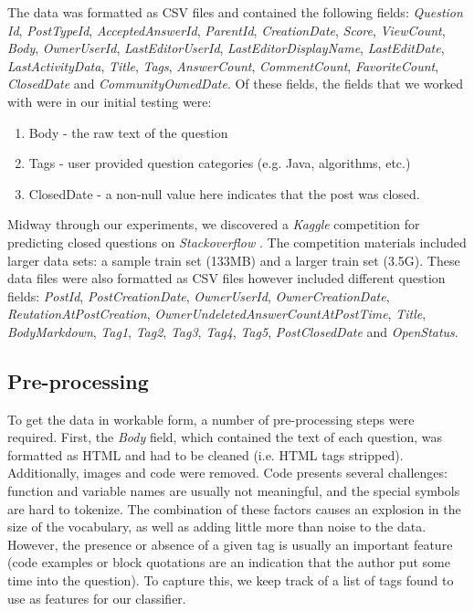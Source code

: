 \documentclass[11pt]{article}
\begin{document}
The data was formatted as CSV files and contained the following
fields: \emph{Question Id}, \emph{PostTypeId}, \emph{AcceptedAnswerId}, \emph{ParentId},
\emph{CreationDate}, \emph{Score}, \emph{ViewCount}, \emph{Body}, \emph{OwnerUserId}, \emph{LastEditorUserId}, \emph{LastEditorDisplayName}, \emph{LastEditDate}, \emph{LastActivityData}, \emph{Title}, \emph{Tags},
\emph{AnswerCount}, \emph{CommentCount}, \emph{FavoriteCount}, \emph{ClosedDate} and
\emph{CommunityOwnedDate}. Of these fields, the fields that we worked with
were in our initial testing were:

\begin{enumerate}
  \item Body - the raw text of the question
  \item Tags - user provided question categories (e.g. Java,
    algorithms, etc.)
  \item ClosedDate - a non-null value here indicates that the post was closed.
\end{enumerate}

Midway through our experiments, we discovered a \emph{Kaggle}
competition for predicting closed questions on \emph{Stackoverflow}
\cite{website:kaggle}. The competition materials included larger data sets: a
sample train set (133MB) and a larger train set (3.5G).  These data
files were also formatted as CSV files however included different
question fields: \emph{PostId}, \emph{PostCreationDate}, \emph{OwnerUserId},
\emph{OwnerCreationDate}, \emph{ReutationAtPostCreation},
\emph{OwnerUndeletedAnswerCountAtPostTime}, \emph{Title}, \emph{BodyMarkdown}, \emph{Tag1}, \emph{Tag2},
\emph{Tag3}, \emph{Tag4}, \emph{Tag5}, \emph{PostClosedDate} and \emph{OpenStatus}.

\subsection{Pre-processing}
To get the data in workable form, a number of pre-processing steps
were required. First, the \emph{Body} field, which contained the text of
each question, was formatted as HTML and had to be
cleaned (i.e. HTML tags stripped). Additionally, images and code were
removed. Code presents several challenges: function and variable names are usually not meaningful, and the special symbols are hard to tokenize. The combination of these factors causes an explosion in the size of the vocabulary, as well as adding little more than noise to the data. However, the presence or absence of a given tag is usually an important feature (code examples or block quotations are an indication that the author put some time into the question). To capture this, we keep track of a list of tags found to use as features for our classifier.
\end{document}
